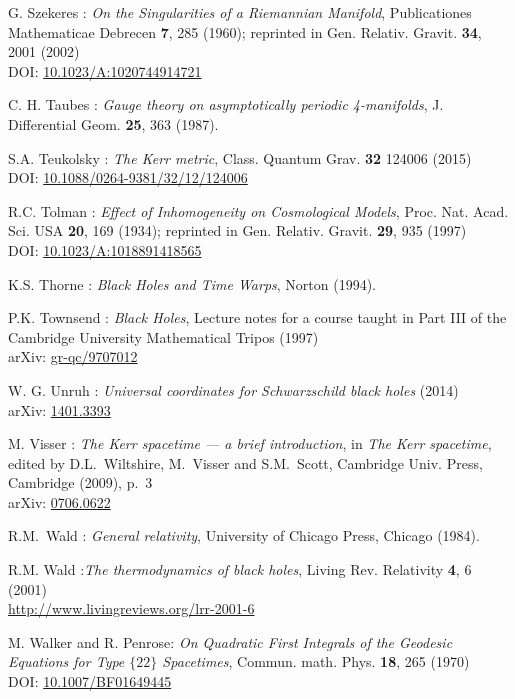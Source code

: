 \begin{thebibliography}{123}
G. Szekeres : {\em On the Singularities of a Riemannian Manifold},
Publicationes Mathematicae Debrecen {\bf 7}, 285 (1960); reprinted in
Gen. Relativ. Gravit. {\bf 34}, 2001 (2002)\\
DOI: \href{http://dx.doi.org/10.1023/A:1020744914721}{10.1023/A:1020744914721}

C. H. Taubes : {\em Gauge theory on asymptotically periodic 4-manifolds},
J. Differential Geom. {\bf 25}, 363 (1987).

S.A. Teukolsky : {\em The Kerr metric},
Class. Quantum Grav. {\bf 32} 124006 (2015)\\
DOI: \href{https://doi.org/10.1088/0264-9381/32/12/124006}{10.1088/0264-9381/32/12/124006}

R.C. Tolman :
{\em Effect of Inhomogeneity on Cosmological Models},
Proc. Nat. Acad. Sci. USA {\bf 20}, 169 (1934);
reprinted in Gen. Relativ. Gravit. {\bf 29}, 935 (1997)\\
DOI: \href{http://dx.doi.org/10.1023/A:1018891418565}{10.1023/A:1018891418565}

K.S. Thorne : {\em Black Holes and Time Warps}, Norton (1994).

P.K. Townsend : {\em Black Holes}, Lecture notes for a course taught in Part III
of the Cambridge University Mathematical Tripos (1997) \\
arXiv: \href{https://arxiv.org/abs/gr-qc/9707012}{gr-qc/9707012}

W. G. Unruh : {\em Universal coordinates for Schwarzschild black holes} (2014)\\
arXiv: \href{https://arxiv.org/abs/1401.3393}{1401.3393}

M. Visser : {\em The Kerr spacetime --- a brief introduction},
in {\em The Kerr spacetime}, edited by D.L.~Wiltshire, M.~Visser and S.M.~Scott,
Cambridge Univ. Press, Cambridge (2009), p.~3\\
arXiv: \href{https://arxiv.org/abs/0706.0622}{0706.0622}

R.M.~Wald : {\em General relativity},
University of Chicago Press, Chicago (1984).

R.M. Wald :{\em The thermodynamics of black holes},
Living Rev. Relativity {\bf 4}, 6 (2001) \\
\url{http://www.livingreviews.org/lrr-2001-6}

M. Walker and R. Penrose: {\em On Quadratic First Integrals of the Geodesic Equations
for Type $\{22\}$ Spacetimes},
Commun. math. Phys. {\bf 18}, 265 (1970)\\
DOI: \href{https://doi.org/10.1007/BF01649445}{10.1007/BF01649445}


\end{thebibliography}
